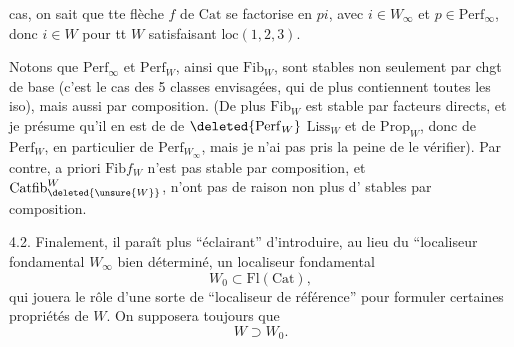 cas, on sait que tte flèche $f$ de $\mathrm{Cat}$ se factorise
en $pi$, avec $i\in W_\infty$ et $p\in\mathrm{Perf}_\infty$, donc
$i\in W$ pour tt $W$ satisfaisant $\mathrm{loc}(1,2,3)$. 

Notons  que $\mathrm{Perf}_\infty$ et $\mathrm{Perf}_W$, ainsi
que $\mathrm{Fib}_W$, sont stables non seulement par
chgt de base (c'est le cas des 5 classes
envisagées, qui de plus contiennent toutes
les iso), mais aussi par composition.
(De plus $\mathrm{Fib}_W$ est stable par facteurs
directs, et je présume qu'il en est de
 de $\deleted{\mathrm{Perf}_W}$ $\mathrm{Liss}_W$ et de $\mathrm{Prop}_W$, donc de
$\mathrm{Perf}_W$, en particulier de $\mathrm{Perf}_{W_\infty}$, mais
je n'ai pas pris la peine de le
vérifier). Par contre, a priori
$\mathrm{Fib}f_W$ n'est pas  stable par composition,
et $\mathrm{Catfib}^{W}_{\deleted{\unsure{W}}}$,   n'ont pas de
raison non plus d' 
stables par composition.

4.2. Finalement, il paraît plus ``éclairant'' d'introduire, au lieu du ``localiseur fondamental $W_\infty$
bien déterminé, un localiseur fondamental
\[
W_0\subset\mathrm{Fl}(\mathrm{Cat}),
\]
qui jouera le rôle d'une sorte de ``localiseur de
référence'' pour formuler certaines propriétés de $W$.
On  supposera toujours que
\[
W\supset W_0.
\]
